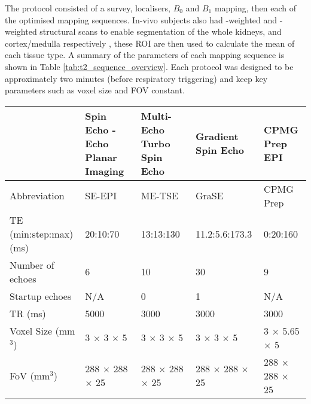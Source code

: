 The protocol consisted of a survey, localisers, $B_0$ and $B_1$ mapping, then each of the optimised \ttwo mapping sequences. In-vivo subjects also had \ttwo-weighted and \tone-weighted structural scans to enable segmentation of the whole kidneys, and cortex/medulla respectively \cite{petzold_building_2014, will_automated_2014}, these \ac{ROI} are then used to calculate the mean \ttwo of each tissue type. A summary of the parameters of each \ttwo mapping sequence is shown in Table \ref{tab:t2_sequence_overview}. Each protocol was designed to be approximately two minutes (before respiratory triggering) and keep key parameters such as voxel size and \ac{FOV} constant.

\begin{table}[H]
	\centering
	\begin{adjustbox}{width=1.0\textwidth, center}
	\begin{tabularx}{1.25\textwidth}{X|X|X|X|X}
		                                                     & Spin Echo - Echo Planar Imaging & Multi-Echo Turbo Spin Echo & Gradient Spin Echo & CPMG \ttwo Prep EPI \\ \hline
		Abbreviation                                         & SE-EPI                          & ME-TSE                     & GraSE              & CPMG \ttwo Prep     \\ \hline
		TE (min:step:max) (ms)                               & 20:10:70                        & 13:13:130                  & 11.2:5.6:173.3     & 0:20:160            \\ \hline
		Number of   echoes                                   & 6                               & 10                         & 30                 & 9                   \\ \hline
		Startup echoes                                       & N/A                             & 0                          & 1                  & N/A                 \\ \hline
		TR (ms)                                              & 5000                            & 3000                       & 3000               & 3000                \\ \hline
		Voxel Size   (mm$^3$)                                & 3 $\times$ 3 $\times$ 5         & 3 $\times$ 3 $\times$ 5    &3 $\times$ 3 $\times$ 5 &3 $\times$ 5.65 $\times$ 5\\ \hline
		FoV (mm$^3$)                                         & 288 $\times$ 288 $\times$ 25    & 288 $\times$ 288 $\times$ 25&288 $\times$ 288 $\times$ 25&288 $\times$ 288 $\times$ 25\\ \hline

\end{tabularx}
\end{adjustbox}
\end{table}
